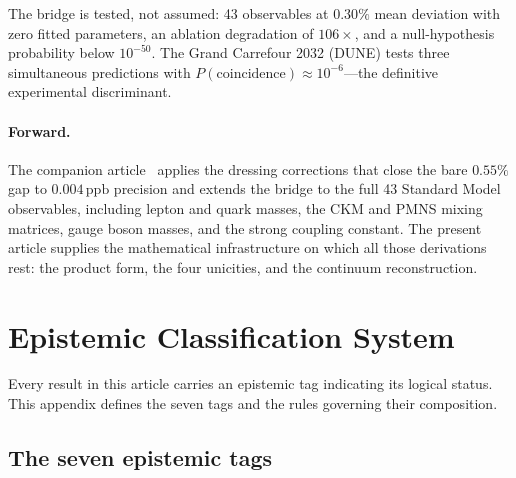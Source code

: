 \documentclass[12pt,a4paper]{article}
\begin{document}
The bridge is tested, not assumed: 43 observables at $0.30\%$ mean
deviation with zero fitted parameters, an ablation degradation of
$106\times$, and a null-hypothesis probability below $10^{-50}$.
The Grand Carrefour 2032 (DUNE) tests three simultaneous predictions
with $P(\text{coincidence}) \approx 10^{-6}$---the definitive
experimental discriminant.

\paragraph{Forward.}
The companion article~\cite{companion_physics} applies the dressing
corrections that close the bare $0.55\%$ gap to $0.004\,\mathrm{ppb}$
precision and extends the bridge to the full 43 Standard Model
observables, including lepton and quark masses, the CKM and PMNS
mixing matrices, gauge boson masses, and the strong coupling constant.
The present article supplies the mathematical infrastructure on which
all those derivations rest: the product form, the four unicities, and
the continuum reconstruction.


\newpage
\appendix


\section{Epistemic Classification System}
\label{app:pm_algebra}

Every result in this article carries an epistemic tag indicating
its logical status. This appendix defines the seven tags and
the rules governing their composition.

\subsection{The seven epistemic tags}
\label{sec:app_d_glyphs}
\end{document}
